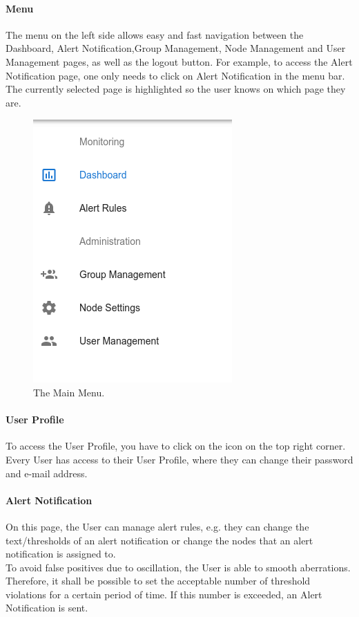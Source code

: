 \documentclass{scrreprt}
\begin{document}
\paragraph{Menu}
The menu on the left side allows easy and fast navigation between the Dashboard, Alert Notification,Group Management, Node Management and User Management pages, as well as the logout button.
For example, to access the Alert Notification page, one only needs to click on Alert Notification in the menu bar.
The currently selected page is highlighted so the user knows on which page they are.
\begin{figure}[!h]
  \centering
  \includegraphics[width=.4\linewidth]{prototype/menu.png}
  \caption{The Main Menu.}
  \label{dbc}
\end{figure}
\paragraph{User Profile}
To access the User Profile, you have to click on the icon on the top right corner.
Every User has access to their User Profile, where they can change their password and e-mail address.
\paragraph{Alert Notification}
On this page, the User can manage alert rules, e.g. they can change the text/thresholds of an alert notification or change the nodes that an alert notification is assigned to.\\
To avoid false positives due to oscillation, the User is able to smooth aberrations. Therefore, it shall be possible to set the acceptable number of threshold violations for a certain period of time. If this number is exceeded, an Alert Notification is sent.
\end{document}
